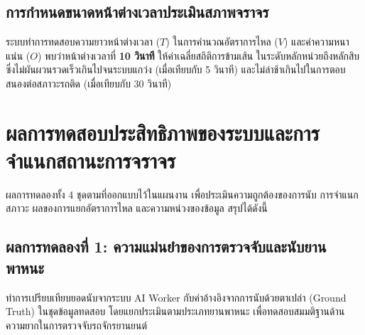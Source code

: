 \documentclass[12pt,a4paper]{report}
\begin{document}
\subsection{การกำหนดขนาดหน้าต่างเวลาประเมินสภาพจราจร}
\label{subsec:time-window}

ระบบทำการทดสอบความยาวหน้าต่างเวลา ($T$) ในการคำนวณอัตราการไหล ($V$)
และค่าความหนาแน่น ($O$)
พบว่าหน้าต่างเวลาที่ \textbf{10 วินาที} ให้ค่าเฉลี่ยสถิติการข้ามเส้น
ในระดับหลักหน่วยถึงหลักสิบ
ซึ่งไม่ผันผวนรวดเร็วเกินไปจนระบบแกว่ง (เมื่อเทียบกับ 5 วินาที)
และไม่ล่าช้าเกินไปในการตอบสนองต่อสภาวะรถติด (เมื่อเทียบกับ 30 วินาที)

\section{ผลการทดสอบประสิทธิภาพของระบบและการจำแนกสถานะการจราจร}
\label{sec:phase2}

ผลการทดลองทั้ง 4 ชุดตามที่ออกแบบไว้ในแผนงาน
เพื่อประเมินความถูกต้องของการนับ การจำแนกสภาวะ
ผลของการแยกอัตราการไหล และความหน่วงของข้อมูล สรุปได้ดังนี้

\subsection{ผลการทดลองที่ 1: ความแม่นยำของการตรวจจับและนับยานพาหนะ}
\label{subsec:exp1}

ทำการเปรียบเทียบยอดนับจากระบบ AI Worker
กับค่าอ้างอิงจากการนับด้วยตาเปล่า (Ground Truth) ในชุดข้อมูลทดสอบ
โดยแยกประเมินตามประเภทยานพาหนะ
เพื่อทดสอบสมมติฐานด้านความยากในการตรวจจับรถจักรยานยนต์
\end{document}
